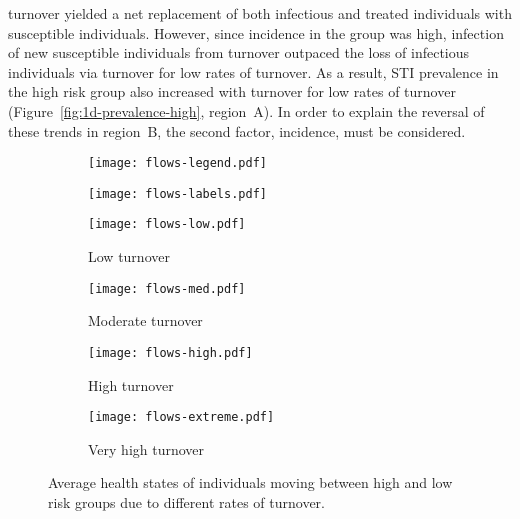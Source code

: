turnover yielded a net replacement of both infectious and treated individuals
with susceptible individuals.
However, since incidence in the group was high,
infection of new susceptible individuals from turnover
outpaced the loss of infectious individuals via turnover
for low rates of turnover.
As a result, STI prevalence in the high risk group
also increased with turnover for low rates of turnover
(Figure~\ref{fig:1d-prevalence-high}, region~A).
In order to explain the reversal of these trends in region~B,
the second factor, incidence, must be considered.
\par
\begin{figure}[!tbp]
  \centering
  \begin{subfigure}[t]{0.6\linewidth}
    \centering
    \texttt{[image: flows-legend.pdf]}
  \end{subfigure}
  \begin{subfigure}[t]{0.15\linewidth}
    \centering
    \texttt{[image: flows-labels.pdf]}
  \end{subfigure}%
  \begin{subfigure}[t]{0.2\linewidth}
    \centering
    \texttt{[image: flows-low.pdf]}
    \caption{Low turnover}
    \label{fig:flows-low}
  \end{subfigure}%
  \begin{subfigure}[t]{0.2\linewidth}
    \centering
    \texttt{[image: flows-med.pdf]}
    \caption{Moderate turnover}
    \label{fig:flows-med}
  \end{subfigure}%
  \begin{subfigure}[t]{0.2\linewidth}
    \centering
    \texttt{[image: flows-high.pdf]}
    \caption{High turnover}
    \label{fig:flows-high}
  \end{subfigure}%
  \begin{subfigure}[t]{0.2\linewidth}
    \centering
    \texttt{[image: flows-extreme.pdf]}
    \caption{Very high turnover}
    \label{fig:flows-extreme}
  \end{subfigure}
  \caption{Average health states of individuals
    moving between high and low risk groups due to different rates of turnover.}
  \label{fig:flows}
\end{figure}
